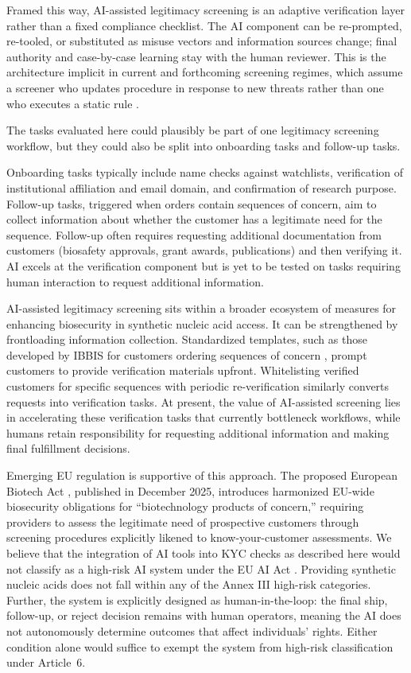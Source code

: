 \documentclass[utf8]{FrontiersinHarvard}
\begin{document}
Framed this way, AI-assisted legitimacy screening is an adaptive verification layer rather than a fixed compliance checklist. The AI component can be re-prompted, re-tooled, or substituted as misuse vectors and information sources change; final authority and case-by-case learning stay with the human reviewer. This is the architecture implicit in current and forthcoming screening regimes, which assume a screener who updates procedure in response to new threats rather than one who executes a static rule \citep{Wheeler2024, EUBiotechAct2025}.

The tasks evaluated here could plausibly be part of one legitimacy screening workflow, but they could also be split into onboarding tasks and follow-up tasks.

Onboarding tasks typically include name checks against watchlists, verification of institutional affiliation and email domain, and confirmation of research purpose. Follow-up tasks, triggered when orders contain sequences of concern, aim to collect information about whether the customer has a legitimate need for the sequence. Follow-up often requires requesting additional documentation from customers (biosafety approvals, grant awards, publications) and then verifying it. AI excels at the verification component but is yet to be tested on tasks requiring human interaction to request additional information.

AI-assisted legitimacy screening sits within a broader ecosystem of measures for enhancing biosecurity in synthetic nucleic acid access. It can be strengthened by frontloading information collection. Standardized templates, such as those developed by IBBIS for customers ordering sequences of concern \citep{IBBIS2025}, prompt customers to provide verification materials upfront. Whitelisting verified customers for specific sequences with periodic re-verification \citep{Crawford2024} similarly converts requests into verification tasks. At present, the value of AI-assisted screening lies in accelerating these verification tasks that currently bottleneck workflows, while humans retain responsibility for requesting additional information and making final fulfillment decisions.

Emerging EU regulation is supportive of this approach. The proposed European Biotech Act \citep{EUBiotechAct2025}, published in December 2025, introduces harmonized EU-wide biosecurity obligations for ``biotechnology products of concern,'' requiring providers to assess the legitimate need of prospective customers through screening procedures explicitly likened to know-your-customer assessments. We believe that the integration of AI tools into KYC checks as described here would not classify as a high-risk AI system under the EU AI Act \citep{EUAIAct2024}. Providing synthetic nucleic acids does not fall within any of the Annex III high-risk categories. Further, the system is explicitly designed as human-in-the-loop: the final ship, follow-up, or reject decision remains with human operators, meaning the AI does not autonomously determine outcomes that affect individuals' rights. Either condition alone would suffice to exempt the system from high-risk classification under Article~6.
\end{document}
